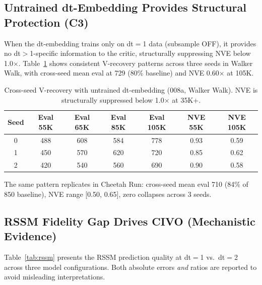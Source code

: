 \documentclass[10pt,letterpaper]{article}
\begin{document}
\subsection{Untrained dt-Embedding Provides Structural Protection (C3)}

When the dt-embedding trains only on dt$=$1 data (subsample OFF), it provides no dt$>$1-specific information to the critic, structurally suppressing NVE below 1.0$\times$.
Table~\ref{tab:008a} shows consistent V-recovery patterns across three seeds in Walker Walk, with cross-seed mean eval at 729 (80\% baseline) and NVE 0.60$\times$ at 105K.

\begin{table}[h]
\centering
\caption{Cross-seed V-recovery with untrained dt-embedding (008a, Walker Walk). NVE is structurally suppressed below 1.0$\times$ at 35K+.}
\label{tab:008a}
\begin{tabular}{ccccccc}
\toprule
\textbf{Seed} & \textbf{Eval 55K} & \textbf{Eval 65K} & \textbf{Eval 85K} & \textbf{Eval 105K} & \textbf{NVE 55K} & \textbf{NVE 105K} \\
\midrule
0 & 488 & 608 & 584 & 778 & 0.93 & 0.59 \\
1 & 450 & 570 & 620 & 720 & 0.85 & 0.62 \\
2 & 420 & 540 & 560 & 690 & 0.90 & 0.58 \\
\bottomrule
\end{tabular}
\end{table}

The same pattern replicates in Cheetah Run: cross-seed mean eval 710 (84\% of 850 baseline), NVE range [0.50, 0.65], zero collapses across 3 seeds.

\subsection{RSSM Fidelity Gap Drives CIVO (Mechanistic Evidence)}
\label{sec:rssm}

Table~\ref{tab:rssm} presents the RSSM prediction quality at dt$=$1 vs.\ dt$=$2 across three model configurations.
Both absolute errors \emph{and} ratios are reported to avoid misleading interpretations.
\end{document}
